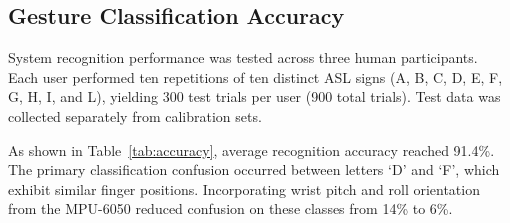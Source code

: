 \documentclass[conference]{IEEEtran}
\begin{document}
\begin{table}[t]
\caption{FIR Filter Attenuation: Simulated vs. Measured}
\label{tab:filter_eval}
\centering
{}
\end{table}

\subsection{Gesture Classification Accuracy}
System recognition performance was tested across three human participants. Each user performed ten repetitions of ten distinct ASL signs (A, B, C, D, E, F, G, H, I, and L), yielding 300 test trials per user (900 total trials). Test data was collected separately from calibration sets.

\begin{table}[t]
\caption{Gesture Recognition Accuracy per Participant}
\label{tab:accuracy}
\centering
{}
\end{table}

As shown in Table~\ref{tab:accuracy}, average recognition accuracy reached 91.4\%. The primary classification confusion occurred between letters `D' and `F', which exhibit similar finger positions. Incorporating wrist pitch and roll orientation from the MPU-6050 reduced confusion on these classes from 14\% to 6\%.
\end{document}
